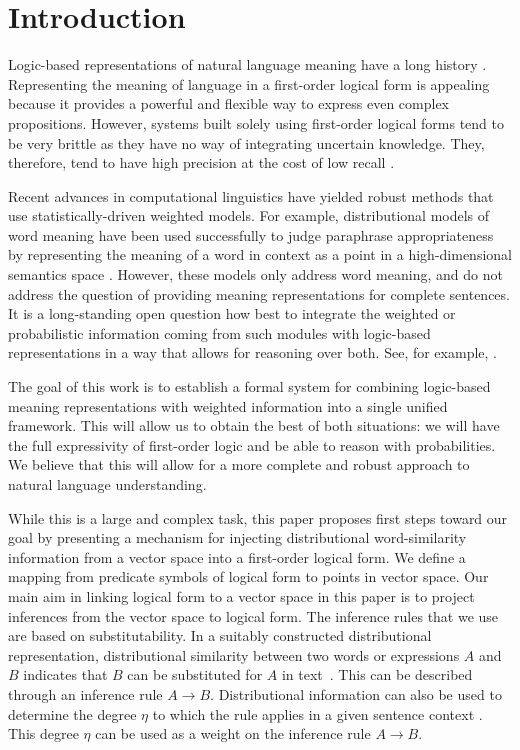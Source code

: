 \section{Introduction}

Logic-based  
representations of natural language meaning have a long history
\citep{montague:tj1970,kamp:book93}\nocite{thomason:book1974}.
Representing the meaning of language in a first-order logical form is appealing
because it provides a powerful and flexible way to express even complex
propositions. However, systems built solely using first-order logical forms tend
to be very brittle as they have no way of integrating uncertain knowledge.
They, therefore, tend to have high precision at the cost of low recall
\citep{bos:emnlp2005}.

Recent advances in computational linguistics have yielded robust methods that
use statistically-driven weighted models.  For example, distributional
models of word meaning have been used successfully to judge paraphrase
appropriateness by representing the meaning of a word in context as a point in a
high-dimensional semantics space
\citep{erk:emnlp2008,thater:acl2010,reisinger:naacl2010,dinu:emnlp2010,vandecruys:emnlp2011}.
However, these models only address word meaning, and do not
address the question of providing meaning representations for complete
sentences. It is a long-standing open question how best to
integrate the weighted or probabilistic information coming from such modules
with logic-based representations in a way that allows for reasoning over both. 
See, for example, \citet{hobbs:alj93}.

The goal of this work is to establish a formal system for combining
logic-based meaning representations with weighted information into a single
unified framework.  This will allow us to obtain the best of both situations: we
will have the full expressivity of first-order logic and be able to reason with
probabilities.  We believe that this will allow for a more complete and robust
approach to natural language understanding.

While this is a large and complex task, this paper proposes first steps toward
our goal by presenting a mechanism for injecting distributional word-similarity
information from a vector space into a first-order logical form.  We
define a mapping from predicate symbols of logical form to points in
vector space. Our main aim in linking logical form to a vector
 space in this paper is to project inferences from the vector space to
logical form. The inference rules that we use are based on
substitutability. In a suitably constructed distributional
representation, distributional similarity between two words or
expressions $A$ and $B$ indicates
that $B$ can be substituted for $A$ in text~\citep{lin:nlej2001}. This can be described through an inference rule $A \to B$. Distributional
information can also be used to determine the degree $\eta$ to which the rule applies in a
given sentence context
\citep{SzpektorEtAl:08,mitchell:acl2008,erk:emnlp2008,thater:acl2010,reisinger:naacl2010,dinu:emnlp2010,vandecruys:emnlp2011}. This
degree $\eta$ can be used as a weight on the inference rule $A\to B$. 

